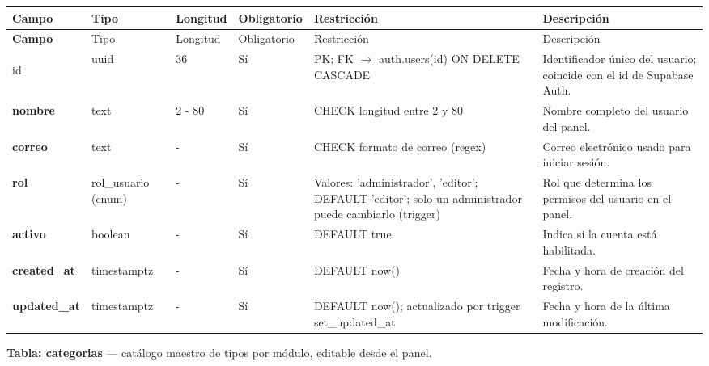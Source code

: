 {\footnotesize
\begin{longtable}{|>{\bfseries}p{3.3cm}|p{2.6cm}|p{1.2cm}|p{1.6cm}|p{2.8cm}|p{4.0cm}|}
\hline
Campo & Tipo & Longitud & Obligatorio & Restricción & Descripción \\ \hline
\endfirsthead
\hline
Campo & Tipo & Longitud & Obligatorio & Restricción & Descripción \\ \hline
\endhead
\hline
\endfoot
\hline
\endlastfoot

id & uuid & 36 & Sí & PK; FK $\rightarrow$ auth.users(id) ON DELETE CASCADE & Identificador único del usuario; coincide con el id de Supabase Auth. \\ \hline
nombre & text & 2 - 80 & Sí & CHECK longitud entre 2 y 80 & Nombre completo del usuario del panel. \\ \hline
correo & text & - & Sí & CHECK formato de correo (regex) & Correo electrónico usado para iniciar sesión. \\ \hline
rol & rol\_usuario (enum) & - & Sí & Valores: 'administrador', 'editor'; DEFAULT 'editor'; solo un administrador puede cambiarlo (trigger) & Rol que determina los permisos del usuario en el panel. \\ \hline
activo & boolean & - & Sí & DEFAULT true & Indica si la cuenta está habilitada. \\ \hline
created\_at & timestamptz & - & Sí & DEFAULT now() & Fecha y hora de creación del registro. \\ \hline
updated\_at & timestamptz & - & Sí & DEFAULT now(); actualizado por trigger set\_updated\_at & Fecha y hora de la última modificación. \\ \hline
\end{longtable}
}

\bigskip
\noindent\textbf{Tabla: categorias} — catálogo maestro de tipos por módulo, editable desde el panel.

